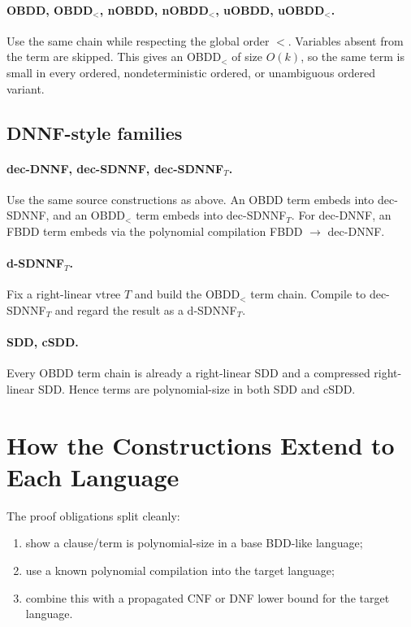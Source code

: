 \documentclass[11pt]{article}
\newcommand{\langref}[1]{\textbf{#1}}
\newcommand{\langfam}[2]{\textbf{#1$_{#2}$}}
\begin{document}
\paragraph{\langref{OBDD}, \langfam{OBDD}{<}, \langref{nOBDD}, \langfam{nOBDD}{<}, \langref{uOBDD}, \langfam{uOBDD}{<}.}
Use the same chain while respecting the global order $<$.
Variables absent from the term are skipped.
This gives an OBDD$_<$ of size $O(k)$, so the same term is small in every ordered, nondeterministic ordered, or unambiguous ordered variant.

\subsection{DNNF-style families}
\paragraph{\langref{dec-DNNF}, \langref{dec-SDNNF}, \langfam{dec-SDNNF}{T}.}
Use the same source constructions as above.
An OBDD term embeds into dec-SDNNF, and an OBDD$_<$ term embeds into dec-SDNNF$_T$.
For dec-DNNF, an FBDD term embeds via the polynomial compilation FBDD $\to$ dec-DNNF.

\paragraph{\langfam{d-SDNNF}{T}.}
Fix a right-linear vtree $T$ and build the OBDD$_<$ term chain.
Compile to dec-SDNNF$_T$ and regard the result as a d-SDNNF$_T$.

\paragraph{\langref{SDD}, \langref{cSDD}.}
Every OBDD term chain is already a right-linear SDD and a compressed right-linear SDD.
Hence terms are polynomial-size in both SDD and cSDD.

\section{How the Constructions Extend to Each Language}
The proof obligations split cleanly:
\begin{enumerate}[noitemsep]
  \item show a clause/term is polynomial-size in a base BDD-like language;
  \item use a known polynomial compilation into the target language;
  \item combine this with a propagated CNF or DNF lower bound for the target language.
\end{enumerate}
\end{document}
